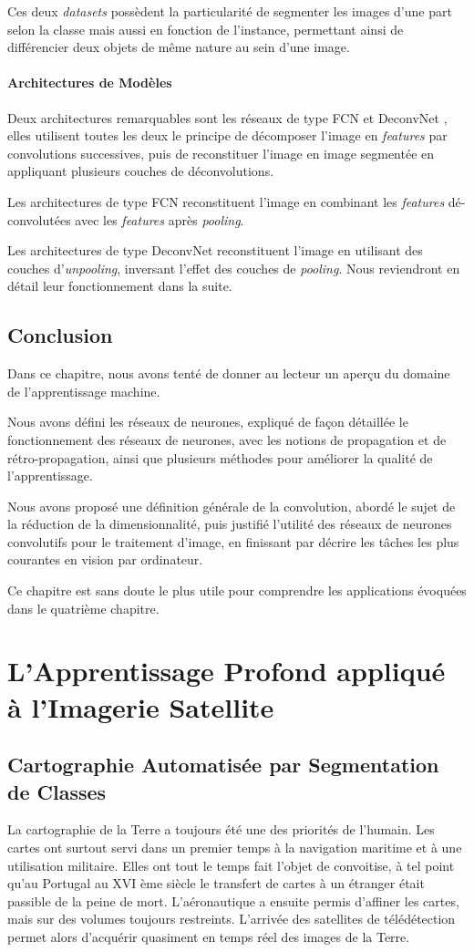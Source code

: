\documentclass[a4paper, 11pt]{report}
\begin{document}
Ces deux \emph{datasets} possèdent la particularité de segmenter les images d'une part selon la classe mais aussi en fonction de l'instance, permettant ainsi de différencier deux objets de même nature au sein d'une image.
\subsubsection{Architectures de Modèles}
Deux architectures remarquables sont les réseaux de type FCN \citep{Long2015} et DeconvNet \citep{Noh2015}, elles utilisent toutes les deux le principe de décomposer l'image en \emph{features} par convolutions successives, puis de reconstituer l'image en image segmentée en appliquant plusieurs couches de déconvolutions.

Les architectures de type FCN reconstituent l'image en combinant les \emph{features} dé-convolutées avec les \emph{features} après \emph{pooling}.

Les architectures de type DeconvNet reconstituent l'image en utilisant des couches d'\emph{unpooling}, inversant l'effet des couches de \emph{pooling}. Nous reviendront en détail leur fonctionnement dans la suite.

\section{Conclusion}
Dans ce chapitre, nous avons tenté de donner au lecteur un aperçu du domaine de l'apprentissage machine.

Nous avons défini les réseaux de neurones, expliqué de façon détaillée le fonctionnement des réseaux de neurones, avec les notions de propagation et de rétro-propagation, ainsi que plusieurs méthodes pour améliorer la qualité de l'apprentissage.

Nous avons proposé une définition générale de la convolution, abordé le sujet de la réduction de la dimensionnalité, puis justifié l'utilité des réseaux de neurones convolutifs pour le traitement d'image, en finissant par décrire les tâches les plus courantes en vision par ordinateur.

Ce chapitre est sans doute le plus utile pour comprendre les applications évoquées dans le quatrième chapitre.
\chapter{L'Apprentissage Profond appliqué à l'Imagerie Satellite}
\section{Cartographie Automatisée par Segmentation de Classes}
La cartographie de la Terre a toujours été une des priorités de l'humain.
Les cartes ont surtout servi dans un premier temps à la navigation maritime et à une utilisation militaire. Elles ont tout le temps fait l'objet de convoitise, à tel point qu'au Portugal au XVI ème siècle le transfert de cartes à un étranger était passible de la peine de mort. L'aéronautique a ensuite permis d'affiner les cartes, mais sur des volumes toujours restreints. L'arrivée des satellites de télédétection permet alors d'acquérir quasiment en temps réel des images de la Terre.
\end{document}

